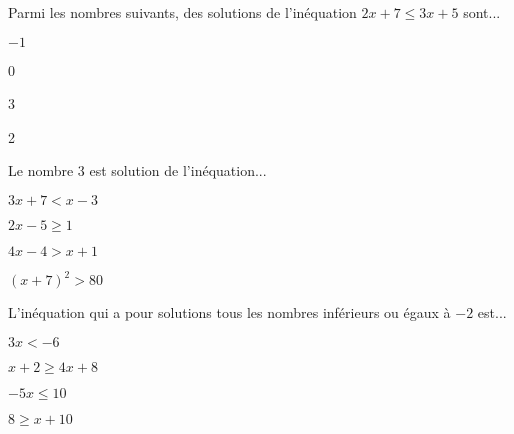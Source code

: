 


\begin{QCM}
  \begin{GroupeQCM} 
  
    \begin{exercice}
      Parmi les nombres suivants, des solutions de l'inéquation
$2x + 7 \leq 3x + 5$ sont...
      \begin{ChoixQCM}{4}
      \item $-1$
      \item 0
      \item 3
      \item 2
      \end{ChoixQCM}
\begin{corrige}
   \end{corrige}
    \end{exercice}
    
    \begin{exercice}
      Le nombre 3 est solution de l'inéquation...
      \begin{ChoixQCM}{4}
      \item $3x+7<x-3$
      \item $2x-5\geq 1$
      \item $4x-4>x+1$
      \item $(x+7)^2>80$
      \end{ChoixQCM}
\begin{corrige}
   \end{corrige}
    \end{exercice}
    
    \begin{exercice}
      L'inéquation qui a pour solutions tous les nombres  inférieurs ou égaux à $-2$  est...
      \begin{ChoixQCM}{4}
      \item $3x<-6$
      \item $x+2\geq 4x+8$
      \item $-5x\leq10$
      \item $8\geq x+10$
      \end{ChoixQCM}
\begin{corrige}
   \end{corrige}
    \end{exercice}
    

\end{GroupeQCM}
\end{QCM}
